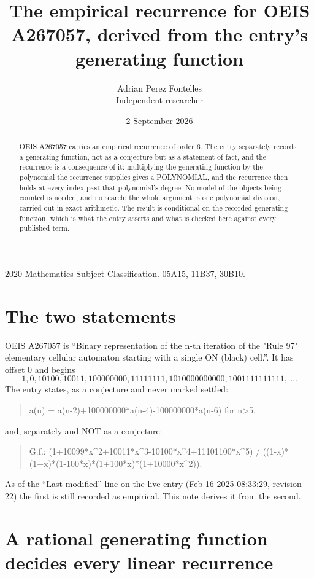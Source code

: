\documentclass[11pt,a4paper]{article}
\title{The empirical recurrence for OEIS A267057, derived from the entry's generating function}
\author{Adrian Perez Fontelles\\ \small Independent researcher}
\date{2 September 2026}
\theoremstyle{plain}
\theoremstyle{definition}
\begin{document}
\maketitle

\begin{abstract}
OEIS A267057 carries an empirical recurrence of order $6$. The entry separately records a
generating function, not as a conjecture but as a statement of fact, and the recurrence is a
consequence of it: multiplying the generating function by the polynomial the recurrence
supplies gives a POLYNOMIAL, and the recurrence then holds at every index past that
polynomial's degree. No model of the objects being counted is needed, and no search: the
whole argument is one polynomial division, carried out in exact arithmetic. The result is
conditional on the recorded generating function, which is what the entry asserts and what is
checked here against every published term.
\end{abstract}

\noindent\small 2020 Mathematics Subject Classification. 05A15, 11B37, 30B10.\normalsize

\section{The two statements}

OEIS A267057 is ``Binary representation of the n-th iteration of the "Rule 97" elementary cellular automaton starting with a single ON (black) cell.''. It has offset $0$ and begins
\[
1, 0, 10100, 10011, 100000000, 11111111, 1010000000000, 1001111111111,\ \dots
\]
The entry states, as a conjecture and never marked settled:
\begin{quote}
a(n) = a(n-2)+100000000*a(n-4)-100000000*a(n-6) for n>5.
\end{quote}
and, separately and NOT as a conjecture:
\begin{quote}
G.f.: (1+10099*x\^{}2+10011*x\^{}3-10100*x\^{}4+11101100*x\^{}5) / ((1-x)*(1+x)*(1-100*x)*(1+100*x)*(1+10000*x\^{}2)).
\end{quote}
As of the ``Last modified'' line on the live entry (Feb 16 2025 08:33:29, revision 22) the first is still
recorded as empirical. This note derives it from the second.

\section{A rational generating function decides every linear recurrence}
\end{document}
